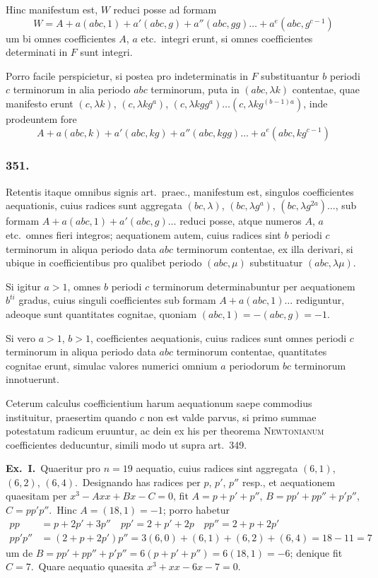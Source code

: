 \documentclass[12pt,a4paper]{article}
\theoremstyle{plain}
\theoremstyle{definition}
\theoremstyle{remark}
\begin{document}
Hinc manifestum est, $W$ reduci posse ad formam
\[W = A+a(abc,1)+a'(abc,g)+a''(abc,gg)\dots+a^e(abc,g^{c-1})\]
um bi omnes coefficientes $A$, $a$ etc.\ integri erunt, si omnes coefficientes
determinati in $F$ sunt integri.

Porro facile perspicietur, si postea pro indeterminatis in $F$ substituantur
$b$ periodi $c$ terminorum in alia periodo $abc$ terminorum, puta in
$(abc,\lambda k)$ contentae, quae manifesto erunt $(c,\lambda k)$,
$(c,\lambda kg^a)$, $(c,\lambda kgg^a)\dots(c,\lambda kg^{(b-1)a})$, inde prodeuntem fore
\[A+a(abc,k)+a'(abc,kg)+a''(abc,kgg)\dots+a^e(abc,kg^{c-1})\]

\subsubsection*{351.}

Retentis itaque omnibus signis art.\ praec., manifestum est, singulos
coefficientes aequationis, cuius radices sunt aggregata $(bc,\lambda)$,
$(bc,\lambda g^a)$, $(bc,\lambda g^{2a})\dots$, sub formam $A+a(abc,1)+a'(abc,g)\dots$
reduci posse, atque numeros $A$, $a$ etc.\ omnes fieri integros; aequationem
autem, cuius radices sint $b$ periodi $c$ terminorum in aliqua periodo data
$abc$ terminorum contentae, ex illa derivari, si ubique in coefficientibus pro
qualibet periodo $(abc,\mu)$ substituatur $(abc,\lambda\mu)$.

Si igitur $a>1$, omnes $b$ periodi $c$ terminorum determinabuntur
per aequationem $b^{ti}$ gradus, cuius singuli coefficientes sub formam
$A+a(abc,1)\dots$ rediguntur, adeoque sunt quantitates cognitae, quoniam
$(abc,1)=-(abc,g)=-1$.

Si vero $a>1$, $b>1$, coefficientes aequationis, cuius radices sunt
omnes periodi $c$ terminorum in aliqua periodo data $abc$ terminorum
contentae, quantitates cognitae erunt, simulac valores numerici omnium
$a$ periodorum $bc$ terminorum innotuerunt.

Ceterum calculus coefficientium harum aequationum saepe commodius
instituitur, praesertim quando $c$ non est valde parvus, si primo summae
potestatum radicum eruuntur, ac dein ex his per theorema \textsc{Newtonianum}
coefficientes deducuntur, simili modo ut supra art.\ 349.

\textbf{Ex.\ I.}\ Quaeritur pro $n=19$ aequatio, cuius radices sint aggregata
$(6,1)$, $(6,2)$, $(6,4)$.\ Designando has radices per $p$, $p'$, $p''$
resp., et aequationem quaesitam per $x^3-Axx+Bx-C=0$, fit
$A=p+p'+p''$, $B=pp'+pp''+p'p''$, $C=pp'p''$.\ Hinc $A=(18,1)=-1$;
porro habetur
\begin{align*}
pp &= p+2p'+3p'' \quad pp'=2+p'+2p \quad pp''=2+p+2p' \\
pp'p'' &= (2+p+2p')p'' = 3(6,0)+(6,1)+(6,2)+(6,4) = 18-11 = 7
\end{align*}
um de $B = pp'+pp''+p'p'' = 6(p+p'+p'') = 6(18,1) = -6$; denique
fit $C=7$.\ Quare aequatio quaesita $x^3+xx-6x-7=0$.
\end{document}
